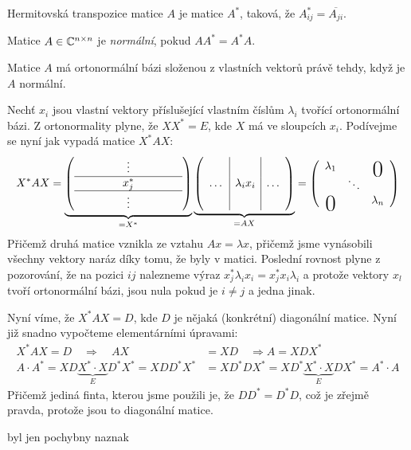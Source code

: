 \df Hermitovská transpozice matice $A$ je matice $A^*$, taková, že $A_{ij}^* = \overline{A_{ji}}$.

\df Matice $A \in \mathbb{C}^{n\times n}$ je {\it normální}, pokud $AA^* = A^*A$.

\vt Matice $A$ má ortonormální bázi složenou z vlastních vektorů právě tehdy, když je $A$ normální.

\dk \begin{description}
	\item \uv{$\Rightarrow$} Nechť $x_i$ jsou vlastní vektory příslušející vlastním číslům $\lambda_i$ tvořící ortonormální bázi. Z ortonormality plyne, že $XX^*=E$, kde $X$ má ve sloupcích $x_i$. Podívejme se nyní jak vypadá matice $X^* A X$:
	\begin{align}
		X^* A X = 
		\underbrace{
		\left(\begin{array}{ccc} &\vdots &\\ \hline \hspace{1cm}& x_j^* & \hspace{1cm}\\ \hline&\vdots& \end{array}\right)}_{=X^*} 
		\underbrace{\left(\begin{array}{c|c|c} \raisebox{5mm}{\ } & &\\ \dots& \lambda_i x_i & \dots\\\raisebox{5mm}{\ }  && \end{array}\right)}_{=AX}
		= \left(\begin{array}{ccc}\lambda_1 &&\bigzero \\ &\ddots & \\ \bigzero&&\lambda_n\end{array}\right)
	\end{align}
	Přičemž druhá matice vznikla ze vztahu $Ax=\lambda x$, přičemž jsme vynásobili všechny vektory naráz díky tomu, že byly v matici. Poslední rovnost plyne z pozorování, že na pozici $ij$ nalezneme výraz $x_j^*\lambda_i x_i = x_j^* x_i \lambda_i$ a protože vektory $x_l$ tvoří ortonormální bázi, jsou nula pokud je $i\neq j$ a jedna jinak.

	Nyní víme, že $X^*AX=D$, kde $D$ je nějaká (konkrétní) diagonální matice. Nyní již snadno vypočteme elementárními úpravami:
	\begin{align*}
		X^* A X = D \quad \Rightarrow \quad AX &= XD \quad \Rightarrow A = XDX^* \\
		A\cdot A^* = XD\underbrace{X^*\cdot X}_ED^*X^* = XDD^*X^*
		&= XD^*DX^* = XD^*\underbrace{X^*\cdot X}_EDX^* = A^*\cdot A
	\end{align*}
	Přičemž jediná finta, kterou jsme použili je, že $DD^* = D^*D$, což je zřejmě pravda, protože jsou to diagonální matice.

	\item \uv{$\Leftarrow$}  byl jen pochybny naznak
\end{description}

